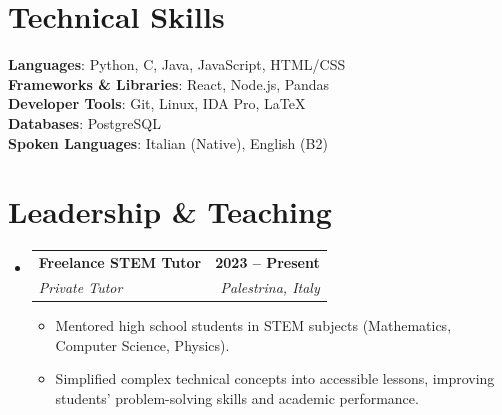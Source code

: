 \documentclass[letterpaper,11pt]{article}
\makeatletter
\newcommand{\resumeItem}[1]{
  \item\small{
    {#1 \vspace{-2pt}}
  }
}
\newcommand{\resumeSubheading}[4]{
  \vspace{-2pt}\item
    \begin{tabular*}{1.0\textwidth}[t]{l@{\extracolsep{\fill}}r}
      \textbf{#1} & \textbf{\small #2} \\
      \textit{\small#3} & \textit{\small #4} \\
    \end{tabular*}\vspace{-7pt}
}
\newcommand{\resumeSubHeadingListStart}{\begin{itemize}[leftmargin=0.0in, label={}]}
\newcommand{\resumeSubHeadingListEnd}{\end{itemize}}
\newcommand{\resumeItemListStart}{\begin{itemize}}
\newcommand{\resumeItemListEnd}{\end{itemize}\vspace{-5pt}}
\makeatother
\begin{document}
\section{Technical Skills}
 \begin{itemize}[leftmargin=0.15in, label={}]
    \small{\item{
     \textbf{Languages}{: Python, C, Java, JavaScript, HTML/CSS} \\
     \textbf{Frameworks \& Libraries}{: React, Node.js, Pandas} \\
     \textbf{Developer Tools}{: Git, Linux, IDA Pro, LaTeX} \\
     \textbf{Databases}{: PostgreSQL} \\
     \textbf{Spoken Languages}{: Italian (Native), English (B2)}
    }}
 \end{itemize}
 \vspace{-16pt}

\section{Leadership \& Teaching}
    \resumeSubHeadingListStart
        \resumeSubheading{Freelance STEM Tutor}{2023 -- Present}{Private Tutor}{Palestrina, Italy}
            \resumeItemListStart
                \resumeItem{Mentored high school students in STEM subjects (Mathematics, Computer Science, Physics).}
                \resumeItem{Simplified complex technical concepts into accessible lessons, improving students' problem-solving skills and academic performance.}
            \resumeItemListEnd
    \resumeSubHeadingListEnd
\end{document}
